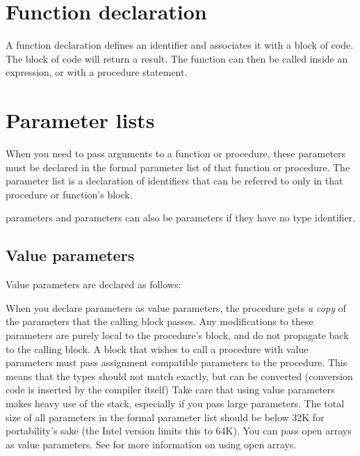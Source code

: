 \documentclass{report}
\begin{document}
\section{Function declaration}
A function declaration defines an identifier and associates it with a
block of code. The block of code will return a result.
The function can then be called inside an expression, or with a procedure
statement.

\section{Parameter lists}
\label{se:Parameters}
When you need to pass arguments to a function or procedure, these parameters
must be declared in the formal parameter list of that function or procedure.
The parameter list is a declaration of identifiers that can be referred to
only in that procedure or function's block.

 parameters and  parameters can also be 
parameters if they have no type identifier.
\subsection{Value parameters}
Value parameters are declared as follows:

When you declare parameters as value parameters, the procedure gets {\em
a copy} of the parameters that the calling block passes. Any modifications
to these parameters are purely local to the procedure's block, and do not
propagate back to the calling block.
A block that wishes to call a procedure with value parameters must pass
assignment compatible parameters to the procedure. This means that the types
should not match exactly, but can be converted (conversion code is inserted
by the compiler itself)
Take care that using value parameters makes heavy use of the stack,
especially if you pass large parameters. The total size of all parameters in
the formal parameter list should be below 32K for portability's sake (the
Intel version limits this to 64K).
You can pass open arrays as value parameters. See  for
more information on using open arrays.
\end{document}

